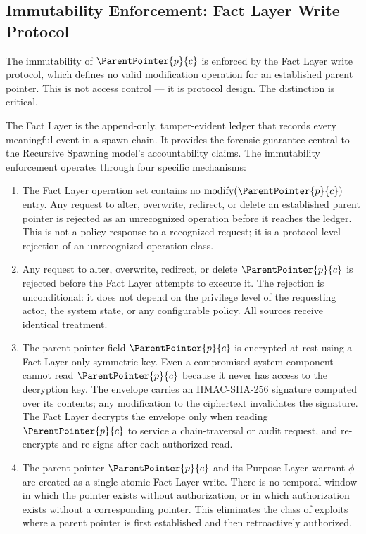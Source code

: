 \subsection{Immutability Enforcement: Fact Layer Write Protocol}
\label{sec:fact-layer-immutability}

The immutability of $\ParentPointer{p}{c}$ is enforced by the Fact Layer write protocol, which defines no valid modification operation for an established parent pointer. This is not access control --- it is protocol design. The distinction is critical.

The Fact Layer is the append-only, tamper-evident ledger that records every meaningful event in a spawn chain. It provides the forensic guarantee central to the Recursive Spawning model's accountability claims. The immutability enforcement operates through four specific mechanisms:

\begin{enumerate}
    \item[(W1) \textbf{No modification operation defined.}] The Fact Layer operation set contains no $\mathrm{modify}(\ParentPointer{p}{c})$ entry. Any request to alter, overwrite, redirect, or delete an established parent pointer is rejected as an unrecognized operation before it reaches the ledger. This is not a policy response to a recognized request; it is a protocol-level rejection of an unrecognized operation class.

    \item[(W2) \textbf{All modification requests rejected unconditionally.}] Any request to alter, overwrite, redirect, or delete $\ParentPointer{p}{c}$ is rejected before the Fact Layer attempts to execute it. The rejection is unconditional: it does not depend on the privilege level of the requesting actor, the system state, or any configurable policy. All sources receive identical treatment.

    \item[(W3) \textbf{Sealed memory envelope.}] The parent pointer field $\ParentPointer{p}{c}$ is encrypted at rest using a Fact Layer-only symmetric key. Even a compromised system component cannot read $\ParentPointer{p}{c}$ because it never has access to the decryption key. The envelope carries an HMAC-SHA-256 signature computed over its contents; any modification to the ciphertext invalidates the signature. The Fact Layer decrypts the envelope only when reading $\ParentPointer{p}{c}$ to service a chain-traversal or audit request, and re-encrypts and re-signs after each authorized read.

    \item[(W4) \textbf{Atomic provisioning.}] The parent pointer $\ParentPointer{p}{c}$ and its Purpose Layer warrant $\phi$ are created as a single atomic Fact Layer write. There is no temporal window in which the pointer exists without authorization, or in which authorization exists without a corresponding pointer. This eliminates the class of exploits where a parent pointer is first established and then retroactively authorized.
\end{enumerate}

